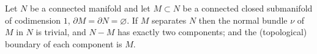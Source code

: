 Let $N$ be a connected manifold and let $M \subset N$ be a connected closed submanifold of codimension $1$, $\partial M = \partial N = \varnothing$. If $M$ separates $N$ then the normal bundle $\nu$ of $M$ in $N$ is trivial, and $N - M$ has exactly two components; and the (topological) boundary of each component is $M$.
